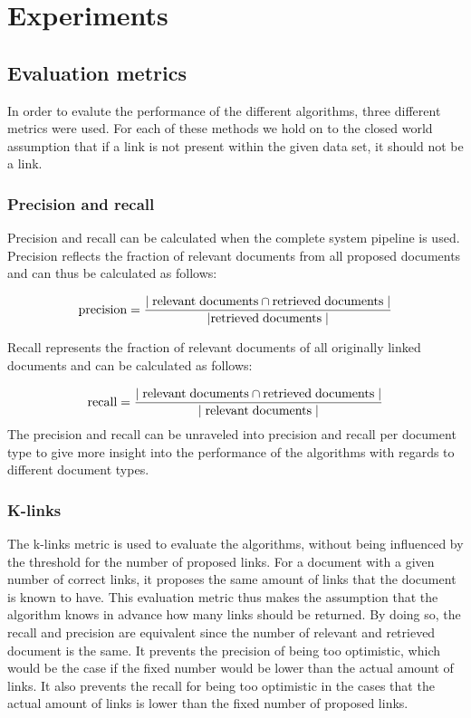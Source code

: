 \section{Experiments}
\subsection{Evaluation metrics}
In order to evalute the performance of the different algorithms, three different metrics were used. For each of these methods we hold on to the closed world assumption that if a link is not present within the given data set, it should not be a link. 

\subsubsection{Precision and recall}
Precision and recall can be calculated when the complete system pipeline is used. Precision reflects the fraction of relevant documents from all proposed documents and can thus be calculated as follows:

\begin{align*}
  \textrm{precision} = \frac{|\;\textrm{relevant\;documents} \cap \textrm{retrieved\;documents}\;|}{|\textrm{retrieved\;documents}\;|}
\end{align*}

Recall represents the fraction of relevant documents of all originally linked documents and can be calculated as follows:

\begin{align}
  \nonumber \textrm{recall} = \frac{|\;\textrm{relevant\;documents} \cap \textrm{retrieved\;documents}\;|}{|\;\textrm{relevant\;documents}\;|}
\end{align}
The precision and recall can be unraveled into precision and recall per document type to give more insight into the performance of the algorithms with regards to different document types. 

\subsubsection{K-links}
The k-links metric is used to evaluate the algorithms, without being influenced by the threshold for the number of proposed links. For a document with a given number of correct links, it proposes the same amount of links that the document is known to have. This evaluation metric thus makes the assumption that the algorithm knows in advance how many links should be returned. By doing so, the recall and precision are equivalent since the number of relevant and retrieved document is the same. It prevents the precision of being too optimistic, which would be the case if the fixed number would be lower than the actual amount of links. It also prevents the recall for being too optimistic in the cases that the actual amount of links is lower than the fixed number of proposed links. 

